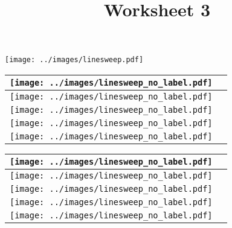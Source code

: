 \documentclass[a4paper,12pt]{article}
\title{Worksheet 3}
\begin{document}
\maketitle

\worksheetGroundRules

\worksheetSubmission

\assignmentInstructions

\vspace{10pt}


\begin{center}
\texttt{[image: ../images/linesweep.pdf]}
\end{center}


\newpage

\begin{tabular}[!h]{|p{6cm}|p{10cm}|}
\hline
\texttt{[image: ../images/linesweep\_no\_label.pdf]} & \\
\hline
\texttt{[image: ../images/linesweep\_no\_label.pdf]} & \\
\hline
\texttt{[image: ../images/linesweep\_no\_label.pdf]} & \\
\hline
\texttt{[image: ../images/linesweep\_no\_label.pdf]} & \\
\hline
\texttt{[image: ../images/linesweep\_no\_label.pdf]} & \\
\hline
\end{tabular}

\begin{tabular}[!h]{|p{6cm}|p{10cm}|}
\hline
\texttt{[image: ../images/linesweep\_no\_label.pdf]} & \\
\hline
\texttt{[image: ../images/linesweep\_no\_label.pdf]} & \\
\hline
\texttt{[image: ../images/linesweep\_no\_label.pdf]} & \\
\hline
\texttt{[image: ../images/linesweep\_no\_label.pdf]} & \\
\hline
\texttt{[image: ../images/linesweep\_no\_label.pdf]} & \\
\hline
\end{tabular}
\end{document}
